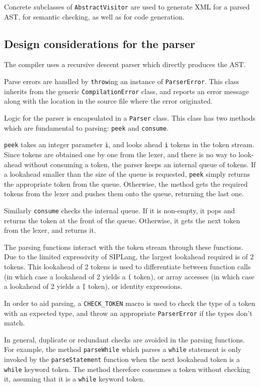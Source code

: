 \documentclass[11pt,a4paper]{scrartcl}
\begin{document}
Concrete subclasses of \verb!AbstractVisitor! are used to generate XML for a parsed AST, for semantic checking, as well as for code generation.

\subsection{Design considerations for the parser}

The compiler uses a recursive descent parser which directly produces the AST.

Parse errors are handled by \verb!throw!ing an instance of \verb!ParserError!. This class inherits from the generic \verb!CompilationError! class, and reports an error message along with the location in the source file where the error originated.

Logic for the parser is encapsulated in a \verb!Parser! class. This class has two methods which are fundamental to parsing: \verb!peek! and \verb!consume!.

\verb!peek! takes an integer parameter \verb!i!, and looks ahead \verb!i! tokens in the token stream. Since tokens are obtained one by one from the lexer, and there is no way to look-ahead without consuming a token, the parser keeps an internal queue of tokens. If a lookahead smaller than the size of the queue is requested, \verb!peek! simply returns the appropriate token from the queue. Otherwise, the method gets the required tokens from the lexer and pushes them onto the queue, returning the last one.

Similarly \verb!consume! checks the internal queue. If it is non-empty, it pops and returns the token at the front of the queue. Otherwise, it gets the next token from the lexer, and returns it.

The parsing functions interact with the token stream through these functions. Due to the limited expressivity of SIPLang, the largest lookahead required is of 2 tokens. This lookahead of 2 tokens is used to differentiate between function calls (in which case a lookahead of 2 yields a \verb!(! token), or array accesses (in which case a lookahead of 2 yields a \verb![! token), or identity expressions.

In order to aid parsing, a \verb!CHECK_TOKEN! macro is used to check the type of a token with an expected type, and throw an appropriate \verb!ParserError! if the types don't match.

In general, duplicate or redundant checks are avoided in the parsing functions. For example, the method \verb!parseWhile! which parses a \verb!while! statement is only invoked by the \verb!parseStatement! function when the next lookahead token is a \verb!while! keyword token. The method therefore consumes a token without checking it, assuming that it is a \verb!while! keyword token.
\end{document}

